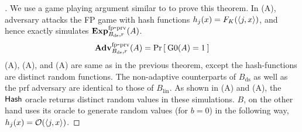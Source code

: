 %
\begin{proof}[]
We use a game playing argument similar to  to prove this theorem. In (A), adversary attacks the FP game with  hash functions $h_j(x) = F_K(\langle j,x \rangle) $, and hence exactly simulates $\mathrm{\mathbf{Exp}}^{\mathrm{fp\mbox{-}prv}}_{B_\mathrm{ds},r}(A)$.
\begin{equation}
\mathrm{\mathbf{Adv}}^{\mathrm{fp\mbox{-}prv}}_{B_\mathrm{ds},r}(A) = \Pr\left[\: \text{G0}(A)=1 \:\right]\label{eq:0T2}
\end{equation}
\noindent
{}(A), (A), and (A) are same as in the previous theorem, except the hash-functions are distinct random functions. The non-adaptive counterparts of $B_\mathrm{ds}$ as well as the prf adversary are  identical to those of $B_\mathrm{lin}$. As shown in (A) and (A), the $\mathsf{Hash}$ oracle returns distinct random values in these simulations. $B$, on the other hand uses its oracle to generate random values (for $b=0$) in the following way, $h_j(x) = {\cal O}(\langle j,x \rangle)$. 


\end{proof}
